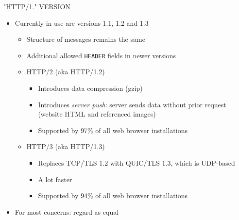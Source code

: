 \begin{frame}[fragile]
%
\begin{codebox}
\ttfamily
"HTTP/1." VERSION
\end{codebox}
%
\begin{itemize}
\item Currently in use are versions 1.1, 1.2 and 1.3
	\begin{itemize}
	\item Structure of messages remains the same
	\item Additional allowed \texttt{HEADER} fields in newer versions
	\item HTTP/2 (aka HTTP/1.2)
		\begin{itemize}
		\item Introduces data compression (\zB gzip)
		\item Introduces \emph{server push}: server sends data without prior request (\zB website HTML and referenced images)
		\item Supported by 97\% of all web browser installations
		\end{itemize}
	\item HTTP/3 (aka HTTP/1.3)
		\begin{itemize}
		\item Replaces TCP/TLS 1.2 with QUIC/TLS 1.3, which is UDP-based
		\item A lot faster
		\item Supported by 94\% of all web browser installations
		\end{itemize}
	\end{itemize}
\item For most concerns: regard as equal
\end{itemize}
%
\end{frame}


